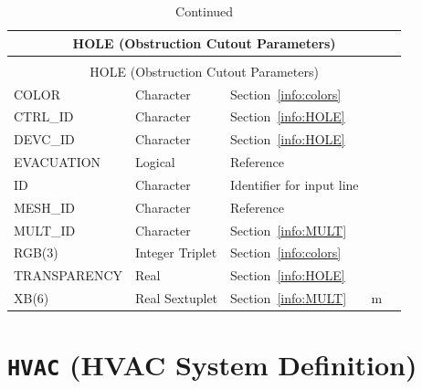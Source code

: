 \documentclass[11pt]{book}
\begin{document}
\begin{longtable}{@{\extracolsep{\fill}}|l|l|l|l|l|}
\caption[Obstruction cutout parameters ({\ct HOLE} namelist group)]{For more information see Section~\ref{info:HOLE}.}
\label{tbl:HOLE} \\
\hline
\multicolumn{5}{|c|}{{\ct HOLE} (Obstruction Cutout Parameters)} \\
\hline \hline
\endfirsthead
\caption[]{Continued} \\
\hline
\multicolumn{5}{|c|}{{\ct HOLE} (Obstruction Cutout Parameters)} \\
\hline \hline
\endhead
{\ct COLOR    }    & Character         & Section~\ref{info:colors}                              &       &           \\ \hline
{\ct CTRL\_ID}     & Character         & Section~\ref{info:HOLE}                                &       &           \\ \hline
{\ct DEVC\_ID}     & Character         & Section~\ref{info:HOLE}                                &       &           \\ \hline
{\ct EVACUATION}   & Logical           & Reference~\cite{FDS_Evac_Users_Guide}                  &       &           \\ \hline
{\ct ID }          & Character         & Identifier for input line                              &       &           \\ \hline
{\ct MESH\_ID }    & Character         & Reference~\cite{FDS_Evac_Users_Guide}                  &       &           \\ \hline
{\ct MULT\_ID }    & Character         & Section~\ref{info:MULT}                                &       &           \\ \hline
{\ct RGB(3)   }    & Integer Triplet   & Section~\ref{info:colors}                              &       &           \\ \hline
{\ct TRANSPARENCY} & Real              & Section~\ref{info:HOLE}                                &       &           \\ \hline
{\ct XB(6)    }    & Real Sextuplet    & Section~\ref{info:MULT}                                & m     &           \\ \hline
\end{longtable}

\vspace{\baselineskip}


\section{\texorpdfstring{{\tt HVAC}}{HVAC} (HVAC System Definition)}
\end{document}
